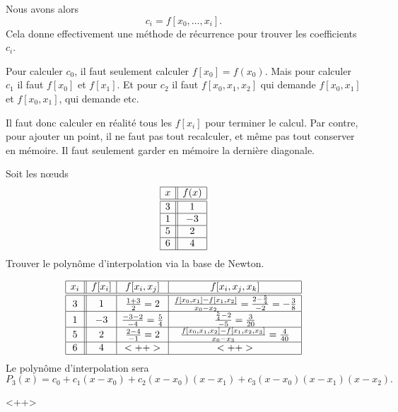 Nous avons alors
\begin{equation}
	c_i=f[x_0,\ldots, x_i].
\end{equation}
Cela donne effectivement une méthode de récurrence pour trouver les coefficients \( c_i\).

\begin{remark}
	Pour calculer \( c_0\), il faut seulement calculer \( f[x_0]=f(x_0)\). Mais pour calculer \( c_1\) il faut \( f[x_0] \) et \( f[x_1]\). Et pour \( c_2\) il faut \( f[x_0,x_1,x_2]\) qui demande \( f[x_0,x_1]\) et \( f[x_0,x_1]\), qui demande etc.

	Il faut donc calculer en réalité tous les \( f[x_i]\) pour terminer le calcul. Par contre, pour ajouter un point, il ne faut pas tout recalculer, et même pas tout conserver en mémoire. Il faut seulement garder en mémoire la dernière diagonale.
\end{remark}

\begin{example}

	Soit les nœuds
	\begin{equation*}
		\begin{array}[]{|c||c|}
			\hline
			x & f(x) \\
			\hline\hline
			3 & 1    \\
			\hline
			1 & -3   \\
			\hline
			5 & 2    \\
			\hline
			6 & 4    \\
			\hline
		\end{array}
	\end{equation*}
	Trouver le polynôme d'interpolation via la base de Newton.


	\begin{equation*}
		\begin{array}[]{|c||c|c|c|}
			\hline
			x_i & f[x_i] & f[x_i,x_j]                          & f[x_i,x_j,x_k]                                                                              \\
			\hline\hline
			3   & 1      & \frac{ 1+3 }{ 2 }=2                 & \frac{ f[x_0,x_1]-f[x_1,x_2] }{ x_0-x_2 }=\frac{ 2-\frac{ 5 }{ 4 } }{ -2 }=-\frac{ 3 }{ 8 } \\
			\hline
			1   & -3     & \frac{ -3-2 }{ -4 }=\frac{ 5 }{ 4 } & \frac{ \frac{ 5 }{ 4 }-2 }{ -5 }=\frac{ 3 }{ 20 }                                           \\
			\hline
			5   & 2      & \frac{ 2-4 }{ -1 }=2                & \frac{ f[x_0,x_1,x_2]-f[x_1,x_2,x_3] }{ x_0-x_3 }=\frac{ 4 }{ 40 }                          \\
			\hline
			6   & 4      & <++>                                & <++>                                                                                        \\
			\hline
		\end{array}
	\end{equation*}
	Le polynôme d'interpolation sera
	\begin{equation}
		P_3(x)=c_0+c_1(x-x_0)+c_2(x-x_0)(x-x_1)+c_3(x-x_0)(x-x_1)(x-x_2).
	\end{equation}

\end{example}
<++>


